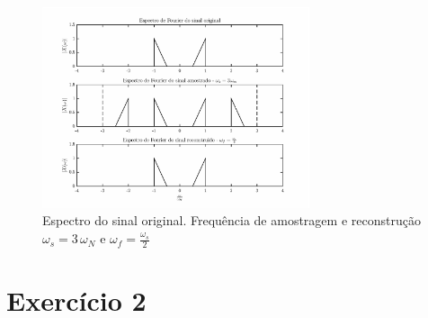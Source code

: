 \documentclass[twoside, fleqn]{article}
\begin{document}
\begin{enumerate}
            \begin{figure}[H]
                \centering
                \includegraphics[width=0.7\textwidth]{./images/ex1d2.eps}
                \caption{Espectro do sinal original. Frequência de amostragem e reconstrução $\omega_s = 3 \, \omega_N$ e $\omega_f = \frac{\omega_s}{2}$}
                \label{fig:ex1d2}
            \end{figure}
    
    \end{enumerate}

\section*{Exercício 2}
\end{document}
